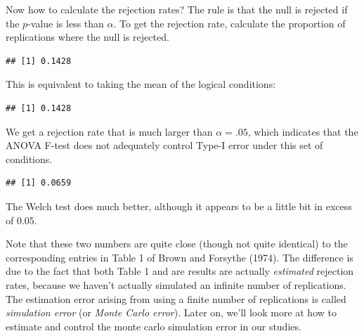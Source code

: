 \documentclass[
]{book}
\newenvironment{Shaded}{\begin{snugshade}}{\end{snugshade}}
\newcommand{\DecValTok}[1]{\textcolor[rgb]{0.00,0.00,0.81}{#1}}
\newcommand{\FloatTok}[1]{\textcolor[rgb]{0.00,0.00,0.81}{#1}}
\newcommand{\FunctionTok}[1]{\textcolor[rgb]{0.00,0.00,0.00}{#1}}
\newcommand{\NormalTok}[1]{#1}
\newcommand{\SpecialCharTok}[1]{\textcolor[rgb]{0.00,0.00,0.00}{#1}}
\begin{document}
Now how to calculate the rejection rates? The rule is that the null is rejected if the \(p\)-value is less than \(\alpha\). To get the rejection rate, calculate the proportion of replications where the null is rejected.

\begin{Shaded}
\end{Shaded}

\begin{verbatim}
## [1] 0.1428
\end{verbatim}

This is equivalent to taking the mean of the logical conditions:

\begin{Shaded}
\end{Shaded}

\begin{verbatim}
## [1] 0.1428
\end{verbatim}

We get a rejection rate that is much larger than \(\alpha = .05\), which indicates that the ANOVA F-test does not adequately control Type-I error under this set of conditions.

\begin{Shaded}
\end{Shaded}

\begin{verbatim}
## [1] 0.0659
\end{verbatim}

The Welch test does much better, although it appears to be a little bit in excess of 0.05.

Note that these two numbers are quite close (though not quite identical) to the corresponding entries in Table 1 of Brown and Forsythe (1974). The difference is due to the fact that both Table 1 and are results are actually \emph{estimated} rejection rates, because we haven't actually simulated an infinite number of replications. The estimation error arising from using a finite number of replications is called \emph{simulation error} (or \emph{Monte Carlo error}).
Later on, we'll look more at how to estimate and control the monte carlo simulation error in our studies.
\end{document}
